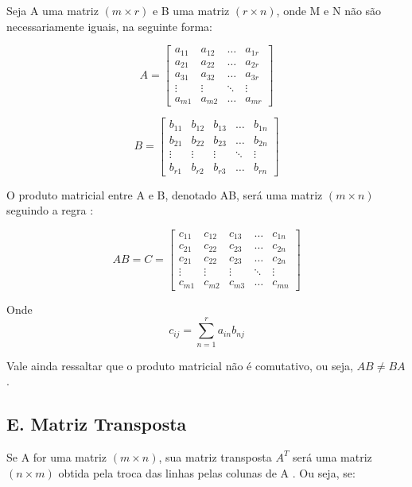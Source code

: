 \documentclass[twocolumn, 10pt]{extarticle}
\begin{document}
Seja A uma matriz $(m \times r)$ e B uma matriz $(r \times n)$, onde M e N não são necessariamente iguais, na seguinte forma:

\[ 
A = 
\begin{bmatrix}
a_{11} & a_{12} & \dots & a_{1r} \\
a_{21} & a_{22} & \dots & a_{2r} \\
a_{31} & a_{32} & \dots & a_{3r} \\
\vdots & \vdots & \ddots & \vdots \\
a_{m1} & a_{m2} & \dots & a_{mr} 

\end{bmatrix}
\]

\[ 
B = 
\begin{bmatrix}
b_{11} & b_{12} & b_{13} & \dots & b_{1n} \\
b_{21} & b_{22} & b_{23} & \dots & b_{2n} \\
\vdots & \vdots & \vdots & \ddots & \vdots \\
b_{r1} & b_{r2} & b_{r3} & \dots & b_{rn} 

\end{bmatrix}
\]

O produto matricial entre A e B, denotado AB, será uma matriz $(m \times n)$ seguindo a regra \cite[p. 30]{antonAlgebra}: 

\[ 
AB = C =
\begin{bmatrix}
c_{11} & c_{12} & c_{13} & \dots & c_{1n} \\
c_{21} & c_{22} & c_{23} & \dots & c_{2n} \\
c_{21} & c_{22} & c_{23} & \dots & c_{2n} \\
\vdots & \vdots & \vdots & \ddots & \vdots \\
c_{m1} & c_{m2} & c_{m3} & \dots & c_{mn} 

\end{bmatrix}
\]

Onde \[c_{ij} = \sum_{n=1}^{r} a_{in}b_{nj}\]

Vale ainda ressaltar que o produto matricial não é comutativo, ou seja, $AB \neq BA$.

\subsection*{E. \quad Matriz Transposta}

Se A for uma matriz $(m \times n)$, sua matriz transposta $A^T$ será uma matriz $(n \times m)$ obtida pela troca das linhas pelas colunas de A \cite[p. 34]{antonAlgebra}. Ou seja, se:
\end{document}

